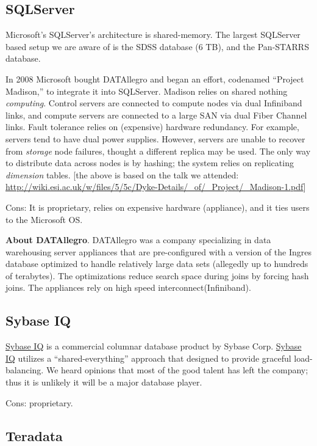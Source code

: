 \documentclass[DM,lsstdraft,toc]{lsstdoc}
\begin{document}
\subsection{SQLServer}\label{sqlserver}

Microsoft's SQLServer's architecture is shared-memory. The largest
SQLServer based setup we are aware of is the SDSS database (6 TB), and
the Pan-STARRS database.

In 2008 Microsoft bought DATAllegro and began an effort, codenamed
``Project Madison,'' to integrate it into SQLServer. Madison relies on
shared nothing \emph{computing}. Control servers are connected to
compute nodes via dual Infiniband links, and compute servers are
connected to a large SAN via dual Fiber Channel links. Fault tolerance
relies on (expensive) hardware redundancy. For example, servers tend to
have dual power supplies. However, servers are unable to recover from
\emph{storage} node failures, thought a different replica may be used.
The only way to distribute data across nodes is by hashing; the system
relies on replicating \emph{dimension} tables. {[}the above is based on
the talk we attended:
\url{http://wiki.esi.ac.uk/w/files/5/5c/Dyke-Details/_of/_Project/_Madison-1.pdf}{]}

Cons: It is proprietary, relies on expensive hardware (appliance), and
it ties users to the Microsoft OS.

\textbf{About DATAllegro}. DATAllegro was a company specializing in data
warehousing server appliances that are pre-configured with a version of
the Ingres database optimized to handle relatively large data sets
(allegedly up to hundreds of terabytes). The optimizations reduce search
space during joins by forcing hash joins. The appliances rely on high
speed interconnect(Infiniband).

\subsection{Sybase IQ}\label{sybase-iq}

\href{}{Sybase IQ} is a commercial columnar database product by Sybase
Corp. \href{}{Sybase IQ} utilizes a ``shared-everything'' approach that
designed to provide graceful load-balancing. We heard opinions that most
of the good talent has left the company; thus it is unlikely it will be
a major database player.

Cons: proprietary.

\subsection{Teradata}\label{teradata}
\end{document}
